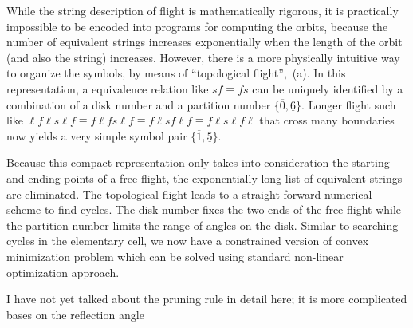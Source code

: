 While the string description of flight is mathematically rigorous, it is
practically impossible to be encoded into programs for computing the orbits,
because the number of equivalent strings increases exponentially when the length
of the orbit (and also the string) increases. However, there is a more
physically intuitive way to organize the symbols, by means of ``topological
flight'', \,(a). In this representation, a equivalence
relation like $sf\equiv fs$ can be uniquely identified by a combination of a
disk number and a partition number $\{\overline{0},\underline{6}\}$. Longer
flight such like $\ell f \ell s \ell f \equiv  f \ell f s \ell f \equiv f \ell s
f \ell f \equiv f \ell s \ell f \ell$ that cross many boundaries now yields a
very simple symbol pair $\{\overline{1},\underline{5}\}$. 

Because this compact representation only takes into consideration the starting
and ending points of a free flight, the exponentially long list of equivalent
strings are eliminated. The topological flight leads to a straight forward
numerical scheme to find cycles. The disk number fixes the two ends of the free
flight while the partition number limits the range of angles on the disk.
Similar to searching cycles in the elementary cell, we now have a constrained
version of convex minimization problem which can be solved using standard
non-linear optimization approach.



    {I have not yet talked about the pruning rule in detail here; it is
    more complicated bases on the reflection angle}
